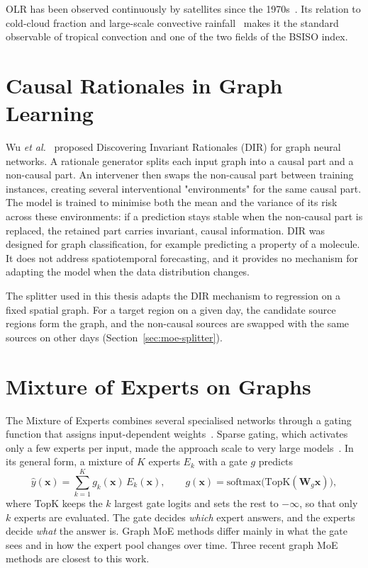 OLR has been observed continuously by satellites since the 1970s~\cite{liebmann1996description}. Its relation to cold-cloud fraction and large-scale convective rainfall~\cite{arkin1987relationship} makes it the standard observable of tropical convection and one of the two fields of the BSISO index.

\section{Causal Rationales in Graph Learning}
\label{sec:lit-dir}

Wu \emph{et al.}~\cite{wu2022discovering} proposed Discovering Invariant Rationales (DIR) for graph neural networks. A rationale generator splits each input graph into a causal part and a non-causal part. An intervener then swaps the non-causal part between training instances, creating several interventional "environments" for the same causal part. The model is trained to minimise both the mean and the variance of its risk across these environments: if a prediction stays stable when the non-causal part is replaced, the retained part carries invariant, causal information. DIR was designed for graph classification, for example predicting a property of a molecule. It does not address spatiotemporal forecasting, and it provides no mechanism for adapting the model when the data distribution changes.

The splitter used in this thesis adapts the DIR mechanism to regression on a fixed spatial graph. For a target region on a given day, the candidate source regions form the graph, and the non-causal sources are swapped with the same sources on other days (Section~\ref{sec:moe-splitter}).

\section{Mixture of Experts on Graphs}
\label{sec:lit-moe}

The Mixture of Experts combines several specialised networks through a gating function that assigns input-dependent weights~\cite{jacobs1991adaptive}. Sparse gating, which activates only a few experts per input, made the approach scale to very large models~\cite{shazeer2017outrageously}. In its general form, a mixture of $K$ experts $E_k$ with a gate $g$ predicts
\begin{equation}
  \hat{y}(\mathbf{x})=\sum_{k=1}^{K} g_k(\mathbf{x})\,E_k(\mathbf{x}),\qquad g(\mathbf{x})=\mathrm{softmax}\big(\mathrm{TopK}(\mathbf{W}_g\mathbf{x})\big),
  \label{eq:moe}
\end{equation}
where TopK keeps the $k$ largest gate logits and sets the rest to $-\infty$, so that only $k$ experts are evaluated. The gate decides \emph{which} expert answers, and the experts decide \emph{what} the answer is. Graph MoE methods differ mainly in what the gate sees and in how the expert pool changes over time. Three recent graph MoE methods are closest to this work.

